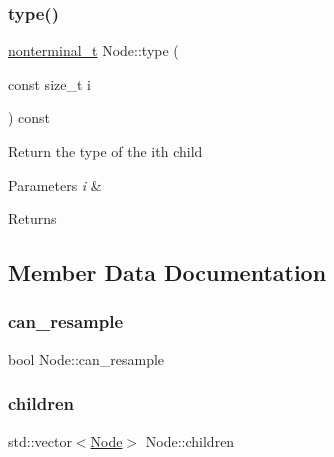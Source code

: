 \subsubsection{\texorpdfstring{type()}{type()}}
{\footnotesize\ttfamily \hyperlink{_nonterminal_8h_a5c1f658dc7560600a16d22408bd716ca}{nonterminal\+\_\+t} Node\+::type (\begin{DoxyParamCaption}\item[{const size\+\_\+t}]{i }\end{DoxyParamCaption}) const\hspace{0.3cm}{\ttfamily [inline]}}

Return the type of the i\textquotesingle{}th child 
\begin{DoxyParams}{Parameters}
{\em i} & \\
\hline
\end{DoxyParams}
\begin{DoxyReturn}{Returns}

\end{DoxyReturn}


\subsection{Member Data Documentation}
\mbox{\label{class_node_a98c14a51b240fbc7e438f40a12276257}} 
\subsubsection{\texorpdfstring{can\+\_\+resample}{can\_resample}}
{\footnotesize\ttfamily bool Node\+::can\+\_\+resample}

\mbox{\label{class_node_af7ddc81358470c3bf7a7819c8b77f53d}} 
\subsubsection{\texorpdfstring{children}{children}}
{\footnotesize\ttfamily std\+::vector$<$\hyperlink{class_node}{Node}$>$ Node\+::children\hspace{0.3cm}{\ttfamily [protected]}}

\mbox{\label{class_node_a336943f2e37a2b6fcbe8b47634719dec}} 
